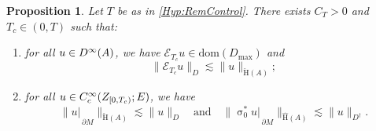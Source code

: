 \documentclass[a4paper,10pt,reqno]{amsart}
\newcommand{\sym}{\upsigma}
\newcommand{\rest}[1]{{{\lvert_{}}_{}}_{#1}}
\newcommand{\norm}[1]{\| #1 \|}%
\newcommand{\Ck}[2][{}]{{\rm C}^{#2}_{\rm #1}}%
\newcommand{\Dk}[2][{}]{{\rm D}^{#2}_{\rm #1}}%
\newcommand{\checkH}{\check{\mathrm{H}}}
\newcommand{\hatH}{\hat{\mathrm{H}}}
\newcommand{\dom}{\mathrm{dom}}
\newcommand{\ext}{\mathcal{E}}
\newcommand{\dM}{\partial M}
\newtheorem{proposition}[theorem]{Proposition}
\theoremstyle{definition}
\begin{document}
\begin{proposition}
\label{Prop:WP}
Let $T$ be as in \ref{Hyp:RemControl}.
There exists $C_{T} > 0$ and $T_c \in (0, T)$ such that:
\begin{enumerate}[label=(\roman*), labelwidth=0pt, labelindent=2pt, leftmargin=21pt]
\item  \label{Prop:WP:3}
      for all $u \in \Dk{\infty}(A)$, we have $\ext_{T_c} u \in \dom(D_{\max})$ and
      $$ \norm{\ext_{T_c} u}_{D} \lesssim \norm{u}_{\checkH(A)};$$
\item \label{Prop:WP:4}
      for all $u \in \Ck[c]{\infty}(Z_{[0,T_c)};E)$, we have
      $$ \norm{u\rest{\dM}}_{\checkH(A)} \lesssim \norm{u}_{D}\quad\text{and}\quad \norm{\sym_0^\ast u\rest{\dM}}_{\hatH(A)} \lesssim \norm{u}_{D^\dagger}.$$
\end{enumerate}
\end{proposition}
\end{document}
